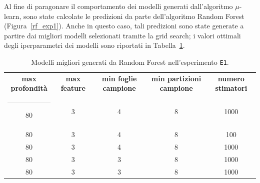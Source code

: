 \documentclass[12pt]{report}
\makeatletter
\theoremstyle{definition}
\newcommand{\thickhline}{%
    \noalign {\ifnum 0=`}\fi \hrule height 1pt
    \futurelet \reserved@a \@xhline
}
\makeatother
\begin{document}
Al fine di paragonare il comportamento dei modelli generati dall'algoritmo $\mu$-learn, sono state calcolate le predizioni da parte dell'algoritmo Random Forest (Figura~\ref{rf_exp1}). Anche in questo caso, tali predizioni sono state generate a partire dai migliori modelli selezionati tramite la grid search; i valori ottimali degli iperparametri dei modelli sono riportati in Tabella~\ref{models_rf_exp1}.

\begin{table}
\centering
\begin{adjustbox}{max width=\textwidth}
 \begin{tabular}{|c|c|c|c|c|} 
 \hline
\textbf{max profondità} & \textbf{max feature} & \textbf{min foglie campione} & \textbf{min partizioni campione} & \textbf{numero stimatori}
\\ [0.5ex] 
 \thickhline
 80 & 3 & 4 & 8 & 1000 \\ 
 80 & 3 & 4 & 8 & 100 \\ 
 80 & 3 & 4 & 8 & 1000 \\ 
 80 & 3 & 3 & 8 & 1000 \\ 
 80 & 3 & 3 & 8 & 1000 \\ 
 \hline
\end{tabular}
\end{adjustbox}
\caption{Modelli migliori generati da Random Forest nell'esperimento \texttt{E1}.}
\label{models_rf_exp1}
\end{table}
\end{document}
